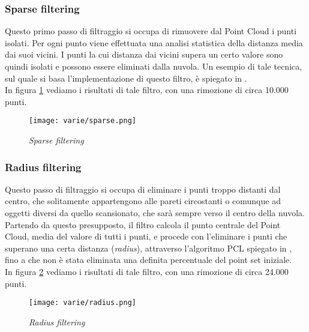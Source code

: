 \subsubsection{Sparse filtering}
Questo primo passo di filtraggio si occupa di rimuovere dal Point Cloud i punti isolati. Per ogni punto viene effettuata una analisi statistica della distanza media dai suoi vicini. I punti la cui distanza dai vicini supera un certo valore sono quindi isolati e possono essere eliminati dalla nuvola.
Un esempio di tale tecnica, sul quale si basa l'implementazione di questo filtro, è spiegato in \cite{site:outliers}.\\
In figura \ref{fig:sparse} vediamo i risultati di tale filtro, con una rimozione di circa 10.000 punti.
\begin{figure}[!h] 
    \centering 
    \texttt{[image: varie/sparse.png]} 
    \caption{\emph{Sparse filtering}}
    \label{fig:sparse}
\end{figure}
\subsubsection{Radius filtering}
Questo passo di filtraggio si occupa di eliminare i punti troppo distanti dal centro, che solitamente appartengono alle pareti circostanti o comunque ad oggetti diversi da quello scansionato, che sarà sempre verso il centro della nuvola.\\
Partendo da questo presupposto, il filtro calcola il punto centrale del Point Cloud, media del valore di tutti i punti, e procede con l'eliminare i punti che superano una certa distanza (\emph{radius}), attraverso l'algoritmo PCL spiegato in \cite{site:passthrough}, fino a che non è stata eliminata una definita percentuale del point set iniziale.\\
In figura \ref{fig:radius} vediamo i risultati di tale filtro, con una rimozione di circa 24.000 punti.
\begin{figure}[!h] 
    \centering 
    \texttt{[image: varie/radius.png]} 
    \caption{\emph{Radius filtering}}
    \label{fig:radius}
\end{figure}
